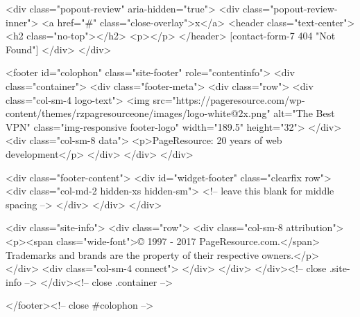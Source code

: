 {<div class="popout-review" aria-hidden="true">
	<div class="popout-review-inner">
		<a href="#" class="close-overlay">x</a>
		<header class="text-center">
			<h2 class="no-top"></h2>
			<p></p>
		</header>
		[contact-form-7 404 "Not Found"]	</div>
</div>

<footer id="colophon" class="site-footer" role="contentinfo">
	<div class="container">
		<div class="footer-meta">
			<div class="row">
				<div class="col-sm-4 logo-text">
					<img src="https://pageresource.com/wp-content/themes/rzpagresourceone/images/logo-white@2x.png" alt="The Best VPN" class="img-responsive footer-logo" width="189.5" height="32">
									</div>
				<div class="col-sm-8 data">
					<p>PageResource: 20 years of web development</p>
				</div>
			</div>
		</div>

		<div class="footer-content">
			<div id="widget-footer" class="clearfix row">
								<div class="col-md-2 hidden-xs hidden-sm">
				<!-- leave this blank for middle spacing -->
				</div>
							</div>
		</div>

		<div class="site-info">
						<div class="row">
				<div class="col-sm-8 attribution">
											<p><span class="wide-font">© 1997 - 2017 PageResource.com.</span> Trademarks and brands are the property of their respective owners.</p>
									</div>
				<div class="col-sm-4 connect">
									</div>
			</div>
		</div><!-- close .site-info -->
	</div><!-- close .container -->

</footer><!-- close #colophon -->

}

